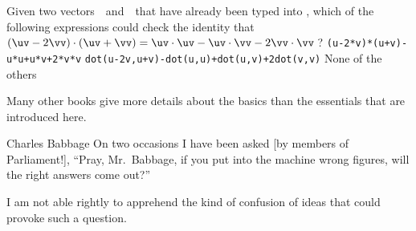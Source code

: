 \begin{activity}
Given two vectors~\uv\ and~\vv\ that have already been typed into \script,
which of the following expressions could check the identity that \((\uv-2\vv)\cdot(\uv+\vv)=\uv\cdot\uv-\uv\cdot\vv-2\vv\cdot\vv\)\,?
{\tt (u-2*v)*(u+v)-u*u+u*v+2*v*v}
{\tt dot(u-2v,u+v)-dot(u,u)+dot(u,v)+2dot(v,v)}
{None of the others}
\end{activity}




Many other books \cite[\S\S1.1--3, e.g.]{Quarteroni2006} give more details about the basics than the essentials that are introduced here.




\begin{quoted}{Charles Babbage}%
On two occasions I have been asked [by members of 
Parliament!], ``Pray, Mr.~Babbage, if you put into the machine wrong figures, will the right answers come out?''

I am not able rightly to apprehend the kind of confusion of ideas that could provoke such a question.
\end{quoted}




\sectionExercises

